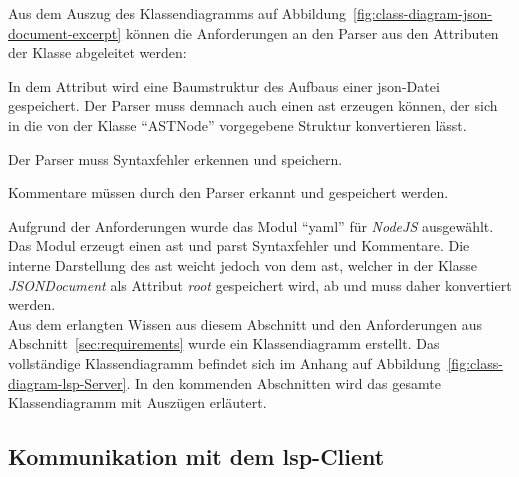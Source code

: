 Aus dem Auszug des Klassendiagramms auf Abbildung~\ref{fig:class-diagram-json-document-excerpt} können die Anforderungen an
den Parser aus den Attributen der Klasse abgeleitet werden:
\begin{description}
      \setlength\itemsep{-0.5cm}
      \item[root]
            In dem Attribut wird eine Baumstruktur des Aufbaus einer \ac{json}-Datei gespeichert. Der Parser muss demnach auch einen \ac{ast} erzeugen können,
            der sich in die von der Klasse ``ASTNode'' vorgegebene Struktur konvertieren lässt.
      \item[syntaxErrors] Der Parser muss Syntaxfehler erkennen und speichern.
      \item[comments] Kommentare müssen durch den Parser erkannt und gespeichert werden.
\end{description}

Aufgrund der Anforderungen wurde das Modul ``yaml'' für \textit{NodeJS} ausgewählt. Das Modul erzeugt einen \ac{ast} und parst Syntaxfehler und Kommentare.
Die interne Darstellung des \ac{ast} weicht jedoch von dem \ac{ast}, welcher in der Klasse \textit{JSONDocument} als Attribut \textit{root}
gespeichert wird, ab und muss daher konvertiert werden.
\\
Aus dem erlangten Wissen aus diesem Abschnitt und den Anforderungen aus Abschnitt~\ref{sec:requirements} wurde ein Klassendiagramm erstellt.
Das vollständige Klassendiagramm befindet sich im Anhang auf Abbildung~\ref{fig:class-diagram-lsp-Server}.
In den kommenden Abschnitten wird das gesamte Klassendiagramm mit Auszügen erläutert.

\subsection{Kommunikation mit dem \acs{lsp}-Client}

